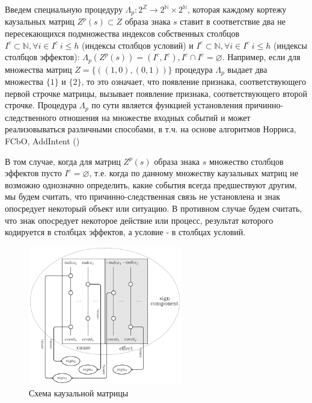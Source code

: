 \documentclass[12pt]{report}
\begin{document}
	Введем специальную процедуру $\Lambda_p: 2^Z\rightarrow 2^{\mathbb N}\times 2^{\mathbb N}$, которая каждому кортежу каузальных матриц $Z^p(s)\subset Z$ образа знака $s$ ставит в соответствие два не пересекающихся подмножества индексов собственных столбцов $I^c\subset\mathbb N, \forall i\in I^c\ i\leq h$ (индексы столбцов условий) и $I^e\subset\mathbb N, \forall i\in I^e\ i\leq h$ (индексы столбцов эффектов): $\Lambda_p(Z^p(s))=(I^c,I^e), I^c\cap I^e=\varnothing$. Например, если для множества матриц $Z=\{((1, 0), (0, 1))\}$ процедура $\Lambda_p$ выдает два множества $\{1\}$ и $\{2\}$, то это означает, что появление признака, соответствующего первой строчке матрицы, вызывает появление признака, соответствующего второй строчке. Процедура $\Lambda_p$ по сути является функцией установления причинно-следственного отношения на множестве входных событий и может реализовываться различными способами, в т.ч. на основе алгоритмов Норриса, FCbO, AddIntent (\cite{Norris1978,Krajca2010,Merwe2004})
	
	В том случае, когда для матриц $Z^p(s)$ образа знака $s$ множество столбцов эффектов пусто $I^e=\varnothing$, т.е. когда по данному множеству каузальных матриц не возможно однозначно определить, какие события всегда предшествуют другим, мы будем считать, что причинно-следственная связь не установлена и знак опосредует некоторый объект или ситуацию. В противном случае будем считать, что знак опосредует некоторое действие или процесс, результат которого кодируется в столбцах эффектов, а условие - в столбцах условий. 
	
	\begin{figure}
		\centering
		\includegraphics[width=0.6\textwidth]{causnet/caus_matr}
		\caption{Схема каузальной матрицы}	
		\label{fig:caus_matr}	
	\end{figure}
	
\end{document}
